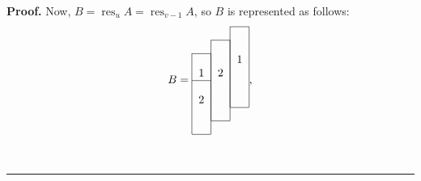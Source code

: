 \documentclass[12pt]{article}
\theoremstyle{plain}
\theoremstyle{definition}
\newenvironment{proof}[1][Proof]{\noindent\textbf{#1.} }{\ \rule{0.5em}{0.5em}}
\begin{document}
\begin{proof}
Now, $B = \operatorname{res}_u A = \operatorname{res}_{v-1}A$, so
$B$ is represented as follows:
\[
B=%
\begin{tabular}{ccc}
\cline{3-3} & & \multicolumn{1}{|c|}{} \\
\cline{2-2} & \multicolumn{1}{|c|}{} & \multicolumn{1}{|c|}{} \\
\cline{1-1} \multicolumn{1}{|c|}{} & \multicolumn{1}{|c|}{} & \multicolumn
{1}{|c|}{1} \\
\multicolumn{1}{|c|}{1} & \multicolumn{1}{|c|}{2} & \multicolumn{1}{|c|}{} \\
\cline{1-1} \multicolumn{1}{|c|}{} & \multicolumn{1}{|c|}{} & \multicolumn
{1}{|c|}{} \\
\multicolumn{1}{|c|}{2} & \multicolumn{1}{|c|}{} & \multicolumn{1}{|c|}{} \\
\cline{3-3} \multicolumn{1}{|c|}{} & \multicolumn{1}{|c|}{} \\
\cline{2-2} \multicolumn{1}{|c|}{} \\
\cline{1-1}
\end{tabular}%
,
\]

\end{proof}
\end{document}
